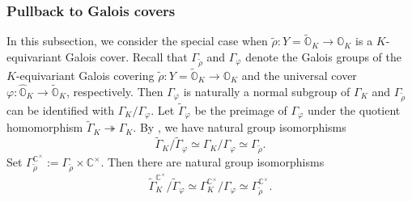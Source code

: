 \documentclass[11pt, a4paper]{amsart}
\newcommand{\C}{\mathbb{C}}
\newcommand{\g}{\mathfrak{g}}
\newcommand{\orb}{\mathbb{O}}
\newcommand{\orbk}{\orb_{K}}
\newcommand{\torbk}{\widetilde{\orb}_{K}}
\newcommand{\horbk}{\widehat{\orb}_{K}}
\newcommand{\Z}{\mathbb{Z}}
\newcommand{\fs}{\mathfrak{s}}
\newcommand{\fsp}{\mathfrak{sp}}
\newcommand{\tGamma}{\widetilde{\Gamma}}
\newcommand{\Sp}{\operatorname{Sp}}
\newcommand{\Id}{\operatorname{Id}}
\newcommand{\R}{\mathbb{R}}
\newcommand{\cm}{\C^\times}
\newcommand{\GR}{G_\R}
\newcommand{\KR}{K_\R}
\newcommand{\GL}{\operatorname{GL}}
\theoremstyle{definition}
\numberwithin{equation}{section}
\begin{document}

\subsubsection{Pullback to Galois covers} \label{subsubsec:galois}

In this subsection, we consider the special case when $\tilde{\rho}: Y = \torbk \to \orbk$ is a $K$-equivariant Galois cover.
Recall that $\Gamma_{\tilde{\rho}}$ and $\Gamma_\varphi$ denote the Galois groups of the $K$-equivariant Galois covering $\tilde{\rho}: Y = \torbk \to \orbk$ and the universal cover $\varphi: \horbk \to \torbk$, respectively. Then $\Gamma_\varphi$ is naturally a normal subgroup of $\Gamma_K$ and $\Gamma_{\tilde{\rho}}$ can be identified with $\Gamma_K/\Gamma_\varphi$. Let $\tGamma_\varphi$ be the preimage of $\Gamma_\varphi$ under the quotient homomorphism $\tGamma_K \twoheadrightarrow \Gamma_K$. By , we have natural group isomorphisms 
    \[ \tGamma_K/\tGamma_\varphi \simeq \Gamma_K/\Gamma_\varphi \simeq \Gamma_{\tilde{\rho}}.\] 
Set $\Gamma_{\tilde{\rho}}^{\cm} := \Gamma_{\tilde{\rho}} \times \cm$. Then there are natural group isomorphisms 
\[ \tGamma_K^{\cm}/\tGamma_\varphi \simeq \Gamma_K^{\cm}/\Gamma_\varphi \simeq \Gamma_{\tilde{\rho}}^{\cm}.\]
\end{document}
